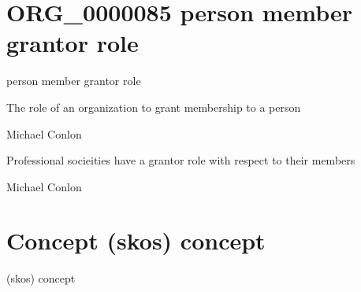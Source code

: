 \documentclass[letterpaper,10pt,english]{sphinxmanual}
\begin{document}
\section{ORG\_0000085 \sphinxhyphen{} person member grantor role}
\label{\detokenize{doc-ORG_0000085:org-0000085-person-member-grantor-role}}\label{\detokenize{doc-ORG_0000085:index-0}}\label{\detokenize{doc-ORG_0000085::doc}}
\begin{sphinxShadowBox}

\sphinxAtStartPar
person member grantor role
\end{sphinxShadowBox}

\begin{sphinxShadowBox}

\sphinxAtStartPar
The role of an organization to grant membership to a person
\end{sphinxShadowBox}

\begin{sphinxShadowBox}

\sphinxAtStartPar
Michael Conlon 
\end{sphinxShadowBox}

\begin{sphinxShadowBox}

\sphinxAtStartPar
Professional socieities have a grantor role with respect to their members
\end{sphinxShadowBox}

\begin{sphinxShadowBox}

\sphinxAtStartPar
Michael Conlon 
\end{sphinxShadowBox}
\begin{quote}
\label{\detokenize{doc-Concept:concept}}\label{\detokenize{doc-Concept:skos-concept}}\label{\detokenize{doc-Concept:concept}}
\ignorespaces \end{quote}


\section{Concept \sphinxhyphen{} (skos) concept}
\label{\detokenize{doc-Concept:concept-skos-concept}}\label{\detokenize{doc-Concept:index-0}}\label{\detokenize{doc-Concept::doc}}
\begin{sphinxShadowBox}

\sphinxAtStartPar
(skos) concept
\end{sphinxShadowBox}
\end{document}

